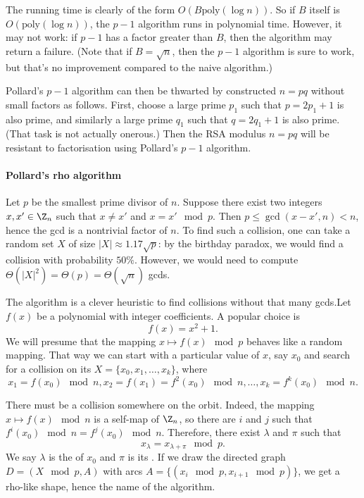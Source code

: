 \documentclass[a4paper, 11pt, openany]{book}
\begin{document}
The running time is clearly of the form $O(B \text{poly}(\log n))$. So if $B$ itself is $O(\text{poly}(\log n))$, the $p-1$ algorithm runs in polynomial time. However, it may not work: if $p-1$ has a factor greater than $B$, then the algorithm may return a failure. (Note that if $B = \sqrt{n}$, then the $p-1$ algorithm is sure to work, but that's no improvement compared to the naive algorithm.)

Pollard's $p-1$ algorithm can then be thwarted by constructed $n = pq$ without small factors as follows. First, choose a large prime $p_1$ such that $p = 2p_1 + 1$ is also prime, and similarly a large prime $q_1$ such that $q = 2q_1 + 1$ is also prime. (That task is not actually onerous.) Then the RSA modulus $n = pq$ will be resistant to factorisation using Pollard's $p-1$ algorithm.


\paragraph{Pollard's rho algorithm}

Let $p$ be the smallest prime divisor of $n$. Suppose there exist two integers $x, x' \in \Z_n$ such that $x \ne x'$ and $x = x' \mod p$. Then $p \le \gcd(x-x',n) < n$, hence the gcd is a nontrivial factor of $n$. To find such a collision, one can take a random set $X$ of size $|X| \approx 1.17 \sqrt{p}$: by the birthday paradox, we would find a collision with probability $50\%$. However, we would need to compute $\Theta(|X|^2) = \Theta(p) = \Theta(\sqrt{n})$ gcds.

The  algorithm is a clever heuristic to find collisions without that many gcds.Let $f(x)$ be a polynomial with integer coefficients. A popular choice is
\[
    f(x) = x^2 + 1.
\]
We will presume that the mapping $x \mapsto f(x) \mod p$ behaves like a random mapping. That way we can start with a particular value of $x$, say $x_0$ and search for a collision on its  $X = \{x_0, x_1, \dots, x_k\}$, where
\[
    x_1 = f(x_0) \mod n, x_2 = f(x_1) = f^2(x_0) \mod n, \dots, x_k = f^k(x_0) \mod n.
\]

There must be a collision somewhere on the orbit. Indeed, the mapping $x \mapsto f(x) \mod n$ is a self-map of $\Z_n$, so there are $i$ and $j$ such that $f^i(x_0) \mod n = f^j(x_0) \mod n$. Therefore, there exist $\lambda$ and $\pi$ such that
\[
    x_\lambda = x_{\lambda + \pi} \mod p.
\]
We say $\lambda$ is the  of $x_0$ and $\pi$ is its . If we draw the directed graph $D = (X \mod p, A)$ with arcs $A = \{ (x_i \mod p, x_{i+1} \mod p) \}$, we get a rho-like shape, hence the name of the algorithm.
\end{document}
